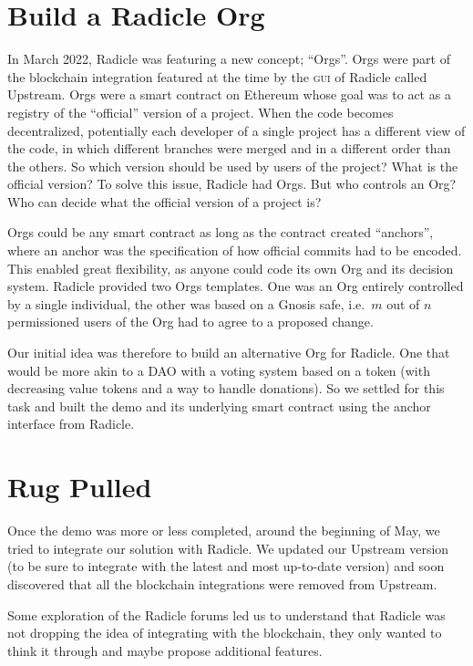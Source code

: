\section{Build a Radicle Org}

In March 2022, Radicle was featuring a new concept; \enquote{Orgs}.
Orgs were part of the blockchain integration featured at the time by the \textsc{gui} of Radicle called Upstream.
Orgs were a smart contract on Ethereum whose goal was to act as a registry of the \enquote{official} version of a project.
When the code becomes decentralized, potentially each developer of a single project has a different view of the code, in which different branches were merged and in a different order than the others.
So which version should be used by users of the project?
What is the official version?
To solve this issue, Radicle had Orgs.
But who controls an Org?
Who can decide what the official version of a project is?

Orgs could be any smart contract as long as the contract created \enquote{anchors}, where an anchor was the specification of how official commits had to be encoded.
This enabled great flexibility, as anyone could code its own Org and its decision system.
Radicle provided two Orgs templates.
One was an Org entirely controlled by a single individual, the other was based on a Gnosis safe, i.e.\ $m$ out of $n$ permissioned users of the Org had to agree to a proposed change.

Our initial idea was therefore to build an alternative Org for Radicle.
One that would be more akin to a DAO with a voting system based on a token (with decreasing value tokens and a way to handle donations).
So we settled for this task and built the demo and its underlying smart contract using the anchor interface from Radicle.

\section{Rug Pulled}

Once the demo was more or less completed, around the beginning of May, we tried to integrate our solution with Radicle.
We updated our Upstream version (to be sure to integrate with the latest and most up-to-date version) and soon discovered that all the blockchain integrations were removed from Upstream.

Some exploration of the Radicle forums led us to understand that Radicle was not dropping the idea of integrating with the blockchain, they only wanted to think it through and maybe propose additional features.

